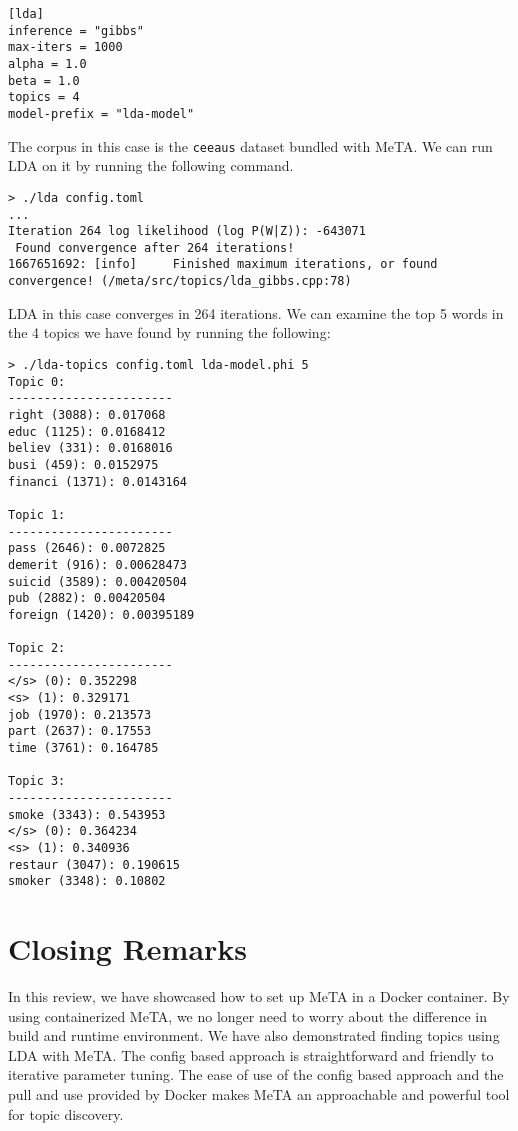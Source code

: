 \documentclass[11pt]{article}
\begin{document}
\begin{verbatim}
[lda]
inference = "gibbs"
max-iters = 1000
alpha = 1.0
beta = 1.0
topics = 4
model-prefix = "lda-model"
\end{verbatim}

The corpus in this case is the \verb,ceeaus, dataset bundled with MeTA.
We can run LDA on it by running the following command.

\begin{verbatim}
> ./lda config.toml
...
Iteration 264 log likelihood (log P(W|Z)): -643071                               
 Found convergence after 264 iterations!
1667651692: [info]     Finished maximum iterations, or found convergence! (/meta/src/topics/lda_gibbs.cpp:78)
\end{verbatim}

LDA in this case converges in 264 iterations.
We can examine the top 5 words in the 4 topics we have found by running the following:

\begin{verbatim}
> ./lda-topics config.toml lda-model.phi 5
Topic 0:
-----------------------
right (3088): 0.017068
educ (1125): 0.0168412
believ (331): 0.0168016
busi (459): 0.0152975
financi (1371): 0.0143164

Topic 1:
-----------------------
pass (2646): 0.0072825
demerit (916): 0.00628473
suicid (3589): 0.00420504
pub (2882): 0.00420504
foreign (1420): 0.00395189

Topic 2:
-----------------------
</s> (0): 0.352298
<s> (1): 0.329171
job (1970): 0.213573
part (2637): 0.17553
time (3761): 0.164785

Topic 3:
-----------------------
smoke (3343): 0.543953
</s> (0): 0.364234
<s> (1): 0.340936
restaur (3047): 0.190615
smoker (3348): 0.10802

\end{verbatim}

\section{Closing Remarks}

In this review, we have showcased how to set up MeTA in a Docker container.
By using containerized MeTA, we no longer need to worry about the difference in build and
runtime environment.
We have also demonstrated finding topics using LDA with MeTA.
The config based approach is straightforward and friendly to iterative parameter tuning.
The ease of use of the config based approach and the pull and use provided by Docker makes
MeTA an approachable and powerful tool for topic discovery.
\end{document}
